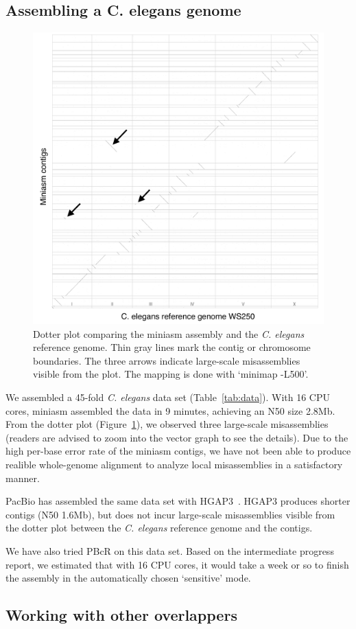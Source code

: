 \documentclass{bioinfo}
\begin{document}
\subsection{Assembling a C. elegans genome}

\begin{figure}[tb]
\includegraphics[width=.48\textwidth]{ce}
\caption{Dotter plot comparing the miniasm assembly and the {\it C. elegans}
reference genome. Thin gray lines mark the contig or chromosome boundaries. The
three arrows indicate large-scale misassemblies visible from the
plot. The mapping is done with `minimap -L500'.}\label{fig:ce}
\end{figure}

We assembled a 45-fold {\it C. elegans} data set (Table~\ref{tab:data}). With 16 CPU cores,
miniasm assembled the data in 9 minutes, achieving an N50 size 2.8Mb. From the
dotter plot (Figure~\ref{fig:ce}), we observed three large-scale misassemblies
(readers are advised to zoom into the vector graph to see the details).  Due to
the high per-base error rate of the miniasm contigs, we have not been able to
produce realible whole-genome alignment to analyze local misassemblies in a
satisfactory manner.

PacBio has assembled the same data set with HGAP3~\citep{Chin:2013qr}. HGAP3
produces shorter contigs (N50 1.6Mb), but does not incur large-scale
misassemblies visible from the dotter plot between the {\it C. elegans}
reference genome and the contigs.

We have also tried PBcR on this data set. Based on the intermediate progress
report, we estimated that with 16 CPU cores, it would take a week or so to
finish the assembly in the automatically chosen `sensitive' mode.

\subsection{Working with other overlappers}
\end{document}
